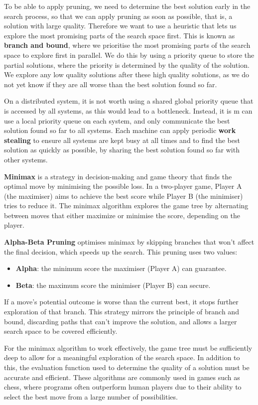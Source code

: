 \documentclass{article}
\newenvironment{aside}[1][]
  {\begin{mdframed}[style=0,%
      leftline=false,rightline=false,leftmargin=2em,rightmargin=2em,%
          innerleftmargin=0pt,innerrightmargin=0pt,linewidth=0.75pt,%
      skipabove=7pt,skipbelow=7pt,#1]\small}
  {\end{mdframed}}
\begin{document}
To be able to apply pruning, we need to determine the best solution
early in the search process, so that we can apply pruning as soon as
possible, that is, a solution with large quality. Therefore we want to
use a heuristic that lets us explore the most promising parts of the
search space first. This is known as \textbf{branch and bound}, where
we prioritise the most promising parts of the search space to explore
first in parallel. We do this by using a priority queue to store the
partial solutions, where the priority is determined by the quality of
the solution. We explore any low quality solutions after these high
quality solutions, as we do not yet know if they are all worse than the
best solution found so far.

On a distributed system, it is not worth using a shared global priority
queue that is accessed by all systems, as this would lead to a
bottleneck. Instead, it is m can use a local priority queue on each
system, and only communicate the best solution found so far to all
systems. Each machine can apply periodic \textbf{work stealing} to
ensure all systems are kept busy at all times and to find the best
solution as quickly as possible, by sharing the best solution found so
far with other systems.
\begin{aside}
    \textbf{Minimax} is a strategy in decision-making and game theory
    that finds the optimal move by minimising the possible loss. In a
    two-player game, Player A (the maximiser) aims to achieve the best
    score while Player B (the minimiser) tries to reduce it. The minimax
    algorithm explores the game tree by alternating between moves that
    either maximize or minimise the score, depending on the player.

    \textbf{Alpha-Beta Pruning} optimises minimax by skipping branches
    that won't affect the final decision, which speeds up the search.
    This pruning uses two values:
    \begin{itemize}
        \item \textbf{Alpha}: the minimum score the maximiser (Player A) can guarantee.
        \item \textbf{Beta}: the maximum score the minimiser (Player B) can secure.
    \end{itemize}
    If a move's potential outcome is worse than the current best, it
    stops further exploration of that branch. This strategy mirrors the
    principle of branch and bound, discarding paths that can't improve
    the solution, and allows a larger search space to be covered
    efficiently.

    For the minimax algorithm to work effectively, the game tree must
    be sufficiently deep to allow for a meaningful exploration of the
    search space. In addition to this, the evaluation function used to
    determine the quality of a solution must be accurate and efficient.
    These algorithms are commonly used in games such as chess, where
    programs often outperform human players due to their ability to
    select the best move from a large number of possibilities.
\end{aside}
\end{document}
